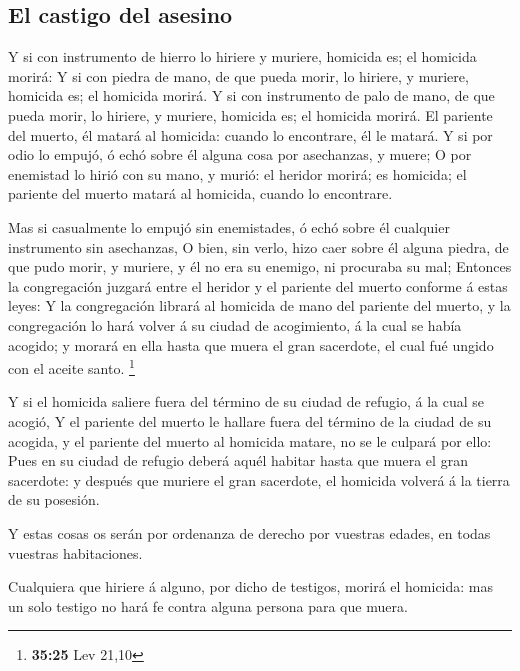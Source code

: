 \hypertarget{el-castigo-del-asesino}{%
\subsection{El castigo del asesino}\label{el-castigo-del-asesino}}

 Y si con instrumento de hierro lo hiriere y muriere,
homicida es; el homicida morirá:  Y si con piedra de
mano, de que pueda morir, lo hiriere, y muriere, homicida es; el
homicida morirá.  Y si con instrumento de palo de mano,
de que pueda morir, lo hiriere, y muriere, homicida es; el homicida
morirá.  El pariente del muerto, él matará al homicida:
cuando lo encontrare, él le matará.  Y si por odio lo
empujó, ó echó sobre él alguna cosa por asechanzas, y muere;
 O por enemistad lo hirió con su mano, y murió: el
heridor morirá; es homicida; el pariente del muerto matará al homicida,
cuando lo encontrare.

 Mas si casualmente lo empujó sin enemistades, ó echó
sobre él cualquier instrumento sin asechanzas,  O bien,
sin verlo, hizo caer sobre él alguna piedra, de que pudo morir, y
muriere, y él no era su enemigo, ni procuraba su mal; 
Entonces la congregación juzgará entre el heridor y el pariente del
muerto conforme á estas leyes:  Y la congregación librará
al homicida de mano del pariente del muerto, y la congregación lo hará
volver á su ciudad de acogimiento, á la cual se había acogido; y morará
en ella hasta que muera el gran sacerdote, el cual fué ungido con el
aceite santo. \footnote{\textbf{35:25} Lev 21,10}

 Y si el homicida saliere fuera del término de su ciudad
de refugio, á la cual se acogió,  Y el pariente del
muerto le hallare fuera del término de la ciudad de su acogida, y el
pariente del muerto al homicida matare, no se le culpará por ello:
 Pues en su ciudad de refugio deberá aquél habitar hasta
que muera el gran sacerdote: y después que muriere el gran sacerdote, el
homicida volverá á la tierra de su posesión.

 Y estas cosas os serán por ordenanza de derecho por
vuestras edades, en todas vuestras habitaciones.

 Cualquiera que hiriere á alguno, por dicho de testigos,
morirá el homicida: mas un solo testigo no hará fe contra alguna persona
para que muera.

